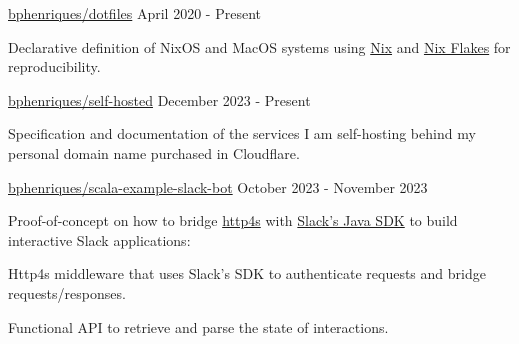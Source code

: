 
\begin{cventries}
  \openSourceEntry
    {\href{https://github.com/bphenriques/dotfiles}{bphenriques/dotfiles}}
    {April 2020 - Present}
    {
    \begin{openSourceDescription}
    Declarative definition of NixOS and MacOS systems using \href{https://nixos.org/}{Nix} and \href{https://nixos.wiki/wiki/Flakes}{Nix Flakes} for reproducibility.
    \end{openSourceDescription}
    \vspace{4mm}
    }

  \vspace{2mm}

  \openSourceEntry
    {\href{https://github.com/bphenriques/self-hosted}{bphenriques/self-hosted}}
    {December 2023 - Present}
    {
    \begin{openSourceDescription}
    Specification and documentation of the services I am self-hosting behind my personal domain name purchased in Cloudflare.
    \end{openSourceDescription}
    \vspace{4mm}
    }

  \vspace{2mm}

\openSourceEntry
    {\href{https://github.com/bphenriques/scala-example-slack-bot}{bphenriques/scala-example-slack-bot}}
    {October 2023 - November 2023}
    {   
    \begin{openSourceDescription}
    Proof-of-concept on how to bridge \href{https://github.com/http4s/http4s}{http4s} with \href{https://github.com/slackapi/java-slack-sdk}{Slack's Java SDK} to build interactive Slack applications:
    \end{openSourceDescription}
    \vspace{8mm}
    \begin{openSourceItems}
        \item Http4s middleware that uses Slack's SDK to authenticate requests and bridge requests/responses.
        \item Functional API to retrieve and parse the state of interactions.
    \end{openSourceItems}
    \vspace{4mm}
    }


\end{cventries}
